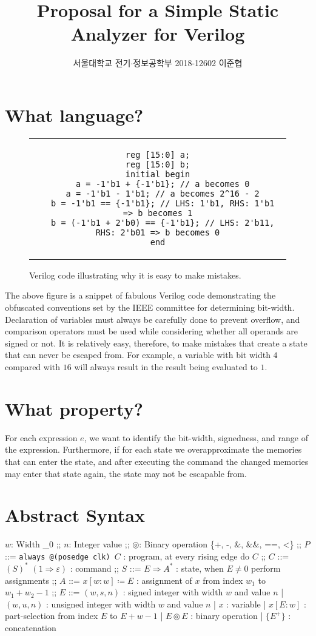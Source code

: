 \documentclass[fleqn]{article}
\title{Proposal for a Simple Static Analyzer for Verilog}
\author{서울대학교 전기$\cdot$정보공학부 2018-12602 이준협}
\date{}
\theoremstyle{definition}
\begin{document}
\maketitle
\section{What language?}
\begin{figure}[htb]
  \centering
\begin{tabular}{c}
\begin{lstlisting}
reg [15:0] a;
reg [15:0] b;
initial begin
  a = -1'b1 + {-1'b1}; // a becomes 0
  a = -1'b1 - 1'b1; // a becomes 2^16 - 2
  b = -1'b1 == {-1'b1}; // LHS: 1'b1, RHS: 1'b1 => b becomes 1
  b = (-1'b1 + 2'b0) == {-1'b1}; // LHS: 2'b11, RHS: 2'b01 => b becomes 0
end
\end{lstlisting}
\end{tabular}
\caption{Verilog code illustrating why it is easy to make mistakes.}
\end{figure}
The above figure is a snippet of fabulous Verilog code demonstrating the obfuscated conventions set by the IEEE committee for determining bit-width. Declaration of variables must always be carefully done to prevent overflow, and comparison operators must be used while considering whether all operands are signed or not. It is relatively easy, therefore, to make mistakes that create a state that can never be escaped from. For example, a variable with bit width $4$ compared with $16$ will always result in the result being evaluated to $1$.

\section{What property?}
For each expression $e$, we want to identify the bit-width, signedness, and range of the expression. Furthermore, if for each state we overapproximate the memories that can enter the state, and after executing the command the changed memories may enter that state again, the state may not be escapable from.

\section{Abstract Syntax}
\begin{bnfgrammar}
  $w$: Width \in {}_0
  ;;
  $n$: Integer value \in {}
  ;;
  $\circledcirc$: Binary operation \in \{+, -, \&, \&\&, ==, <\}
  ;;
  $P$ ::= \texttt{always @(posedge clk) }$C$ : program, at every rising edge do $C$
  ;;
  $C$ ::= $(S)^{*}$ $(1\Rightarrow\varepsilon)$ : command
  ;;
  $S$ ::= $E\Rightarrow A^{*}$ : state, when $E \neq 0$ perform assignments
  ;;
  $A$ ::= $x[w\colon w]\coloneq E$ : assignment of $x$ from index $w_{1}$ to $w_{1}+w_{2}-1$
  ;;
  $E$ ::= $(w, s, n)$ : signed integer with width $w$ and value $n$
  | $(w, u, n)$ : unsigned integer with width $w$ and value $n$
  | $x$ : variable
  | $x[E\colon w]$ : part-selection from index $E$ to $E+w-1$
  | $E \circledcirc E$ : binary operation
  | $\{E^{+}\}$ : concatenation
\end{bnfgrammar}
\end{document}
